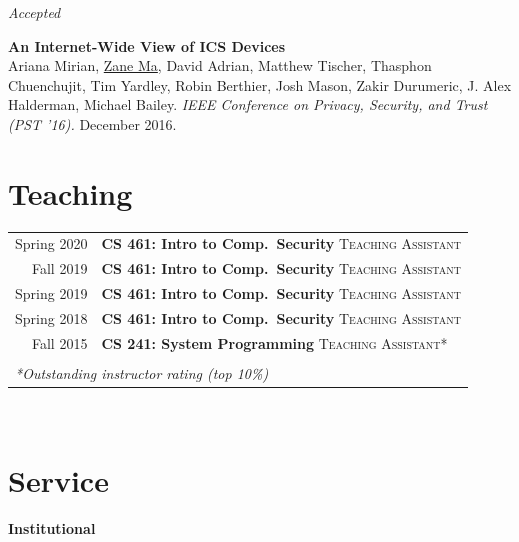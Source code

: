 \documentclass[10pt,singlecolumn]{article} %
\begin{document}

\vspace{6pt}
{\raggedleft\textit{Accepted}\par}

\textbf{An Internet-Wide View of ICS Devices}\\
Ariana Mirian, \underline{Zane Ma}, David Adrian, Matthew Tischer, Thasphon Chuenchujit, Tim Yardley, Robin Berthier, Josh Mason, Zakir Durumeric, J. Alex Halderman, Michael Bailey.
\textit{IEEE Conference on Privacy, Security, and Trust (PST '16).} December 2016. \\




\section{Teaching} 

\begin{tabular}{rl}
Spring 2020	 & \textbf{CS 461: Intro to Comp.\ Security} \textsc{Teaching Assistant}\\ 
Fall 2019	 & \textbf{CS 461: Intro to Comp.\ Security} \textsc{Teaching Assistant}\\
Spring 2019	 & \textbf{CS 461: Intro to Comp.\ Security} \textsc{Teaching Assistant}\\  
Spring 2018	 & \textbf{CS 461: Intro to Comp.\ Security} \textsc{Teaching Assistant}\\ 
Fall 2015	 & \textbf{CS 241: System Programming} \textsc{Teaching Assistant*}\\ \\
\multicolumn{2}{l}{\textit{*Outstanding instructor rating (top 10\%)}}
\end{tabular}\\[10pt]


\section{Service}

\textbf{Institutional}\\
\end{document}
